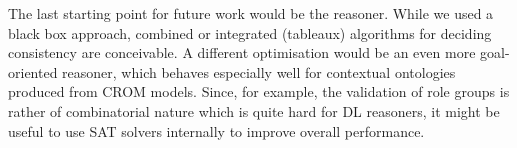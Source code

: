 The last starting point for future work would be the reasoner. While we used a black box approach,
combined or integrated (tableaux) algorithms for deciding consistency are conceivable. A different
optimisation would be an even more goal-oriented reasoner, which behaves especially well for
contextual ontologies produced from CROM models. Since, for example, the validation of role groups is
rather of combinatorial nature which is quite hard for DL reasoners, it might be useful to use SAT
solvers internally to improve overall performance.





